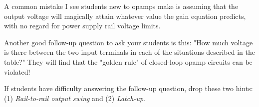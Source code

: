 





A common mistake I see students new to opamps make is assuming that the output voltage will magically attain whatever value the gain equation predicts, with no regard for power supply rail voltage limits.

Another good follow-up question to ask your students is this: "How much voltage is there between the two input terminals in each of the situations described in the table?"  They will find that the "golden rule" of closed-loop opamp circuits can be violated!

If students have difficulty answering the follow-up question, drop these two hints: (1) {\it Rail-to-rail output swing} and (2) {\it Latch-up}.




